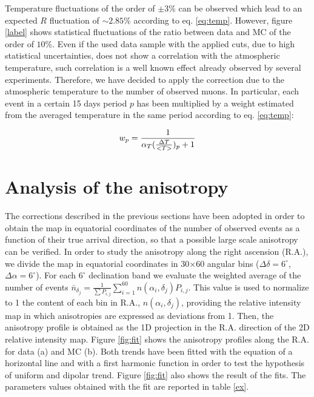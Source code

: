\documentclass[a4paper]{jpconf}
\begin{document}
Temperature fluctuations of the order of $\pm 3\%$ can be observed which lead to an expected $R$ fluctuation of $\sim 2.85\%$ according to eq. \ref {eq:temp}. However, figure \ref {label} shows statistical fluctuations of the ratio between data and MC of the order of $10\%$. Even if the used data sample with the applied cuts, due to high statistical uncertainties, does not show a correlation with the atmospheric temperature, such correlation is a well known effect already observed by several experiments. Therefore, we have decided to apply the correction due to the atmospheric temperature to the number of observed muons. In particular, each event in a certain 15 days period $p$ has been multiplied by a weight estimated from the averaged temperature in the same period according to eq. \ref {eq:temp}:

\begin{equation}
\centering
\label{eq:pesot}
w_p=\frac{1}{\alpha _T (\frac{\Delta T}{<T>})_p +1}
\end{equation}

\section{Analysis of the anisotropy}
The corrections described in the previous sections have been adopted in order to obtain the map in equatorial coordinates of the number of observed events as a function of their true arrival direction, so that a possible large scale anisotropy can be verified. In order to study the anisotropy along the right ascension (R.A.), we divide the map in equatorial coordinates in 30$\times$60 angular bins ($\Delta \delta = 6^{\circ}$, $\Delta \alpha = 6^{\circ}$). For each $6^{\circ}$ declination band we evaluate the weighted average of the number of events $\bar{n}_{\delta _j} = \frac{1}{\sum P_{i,j}} \sum_{i=1}^{60} n(\alpha _i , \delta _j)P_{i,j}$. This value is used to normalize to 1 the content of each bin in R.A., $n(\alpha _i, \delta _j)$, providing the relative intensity map in which anisotropies are expressed as deviations from 1. Then, the anisotropy profile is obtained as the 1D projection in the R.A. direction of the 2D relative intensity map. Figure \ref {fig:fit} shows the anisotropy profiles along the R.A. for data (a) and MC (b). Both trends have been fitted with the equation of a horizontal line and with a first harmonic function in order to test the hypothesis of uniform and dipolar trend.  Figure \ref {fig:fit} also shows the result of the fits.  The parameters values obtained with the fit are reported in table \ref {ex}. 
\end{document}

